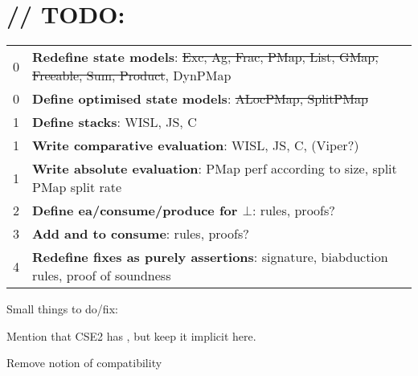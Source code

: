 \chapter{// TODO:}

\begin{tabularx}{\textwidth}{c|X}
	\thead{Priority} & \thead{Name}\\ \hline\hline
	0 & \textbf{Redefine state models}: \sout{Exc, Ag, Frac, PMap, List,  GMap, Freeable, Sum, Product}, DynPMap \\ \hline
	0 & \textbf{Define optimised state models}: \sout{ALocPMap, SplitPMap} \\ \hline
	1 & \textbf{Define stacks}: WISL, JS, C \\ \hline
	1 & \textbf{Write comparative evaluation}: WISL, JS, C, (Viper?) \\ \hline
	1 & \textbf{Write absolute evaluation}: PMap perf according to size, split PMap split rate \\
	2 & \textbf{Define ea/consume/produce for $\bot$}: rules, proofs? \\ \hline
	3 & \textbf{Add \LFail{} and \Miss{} to consume}: rules, proofs? \\ \hline
	4 & \textbf{Redefine fixes as purely assertions}: signature, biabduction rules, proof of soundness \\ \hline
\end{tabularx}

Small things to do/fix: \begin{compactitem}
 \item Mention that CSE2 has \SV, but keep it implicit here.
 \item Remove notion of compatibility	
 \end{compactitem}
